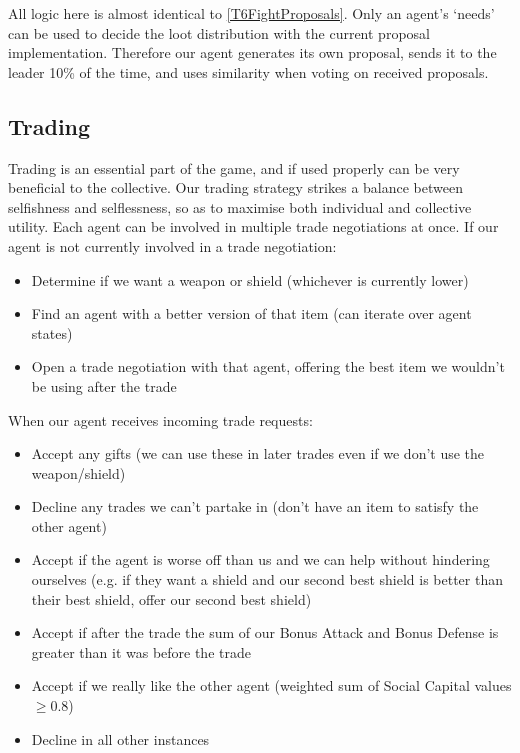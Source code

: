 All logic here is almost identical to \ref{T6FightProposals}. Only an agent's `needs' can be used to decide the loot distribution with the current proposal implementation. Therefore our agent generates its own proposal, sends it to the leader 10\% of the time, and uses similarity when voting on received proposals.

\subsection{Trading}

Trading is an essential part of the game, and if used properly can be very beneficial to the collective. Our trading strategy strikes a balance between selfishness and selflessness, so as to maximise both individual and collective utility. Each agent can be involved in multiple trade negotiations at once.
If our agent is not currently involved in a trade negotiation:

\begin{itemize}
    \item Determine if we want a weapon or shield (whichever is currently lower)
    \item Find an agent with a better version of that item (can iterate over agent states)
    \item Open a trade negotiation with that agent, offering the best item we wouldn't be using after the trade
\end{itemize}
When our agent receives incoming trade requests:

\begin{itemize}
    \item Accept any gifts (we can use these in later trades even if we don't use the weapon/shield)
    \item Decline any trades we can't partake in (don't have an item to satisfy the other agent)
    \item Accept if the agent is worse off than us and we can help without hindering ourselves (e.g. if they want a shield and our second best shield is better than their best shield, offer our second best shield)
    \item Accept if after the trade the sum of our Bonus Attack and Bonus Defense is greater than it was before the trade
    \item Accept if we really like the other agent (weighted sum of Social Capital values $\geq 0.8$)
    \item Decline in all other instances
\end{itemize}


